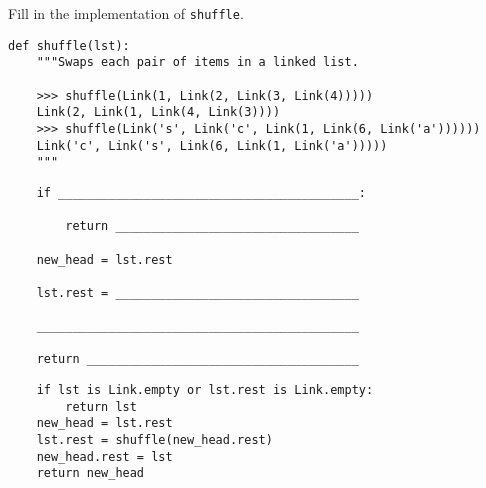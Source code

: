 \begin{blocksection}
\question Fill in the implementation of \lstinline$shuffle$.

\begin{lstlisting}
def shuffle(lst):
    """Swaps each pair of items in a linked list.

    >>> shuffle(Link(1, Link(2, Link(3, Link(4)))))
    Link(2, Link(1, Link(4, Link(3))))
    >>> shuffle(Link('s', Link('c', Link(1, Link(6, Link('a'))))))
    Link('c', Link('s', Link(6, Link(1, Link('a')))))
    """
\end{lstlisting}

\ifprintanswers\else
\begin{lstlisting}
    if __________________________________________:

        return __________________________________

    new_head = lst.rest

    lst.rest = __________________________________

    _____________________________________________

    return ______________________________________
\end{lstlisting}
\fi

\begin{solution}
\begin{lstlisting}
    if lst is Link.empty or lst.rest is Link.empty:
        return lst
    new_head = lst.rest
    lst.rest = shuffle(new_head.rest)
    new_head.rest = lst
    return new_head
\end{lstlisting}
\end{solution}
\end{blocksection}
